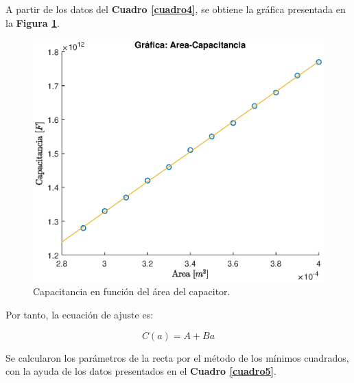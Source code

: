 \documentclass[letter,11pt]{article}
\begin{document}
A partir de los datos del \textbf{Cuadro \ref{cuadro4}}, se obtiene la gráfica
presentada en la \textbf{Figura \ref{figura6}}.

\begin{figure}[!h]
\centering
\includegraphics[scale=1.00]{resources/m2.eps}
\caption{Capacitancia en función del área del capacitor.}
\label{figura6}
\end{figure}

Por tanto, la ecuación de ajuste es:

\begin{equation*}
    C(a) = A + B a
\end{equation*}

Se calcularon los parámetros de la recta por el método de los mínimos cuadrados,
con la ayuda de los datos presentados en el \textbf{Cuadro \ref{cuadro5}}.
\end{document}
